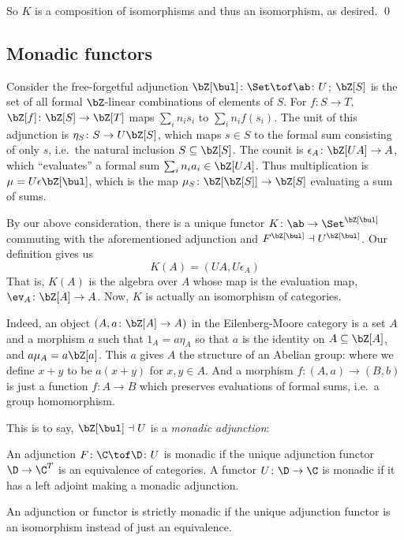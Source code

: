     So $K$ is a composition of isomorphisms and thus an isomorphism, as desired.
    \qed

\eproof

\subsection{Monadic functors}

Consider the free-forgetful adjunction $\bZ[\bul]\colon\Set\tof\ab\colon U$; $\bZ[S]$ is the set of all formal $\bZ$-linear combinations of elements of $S$.
For $f\colon S\to T$, $\bZ[f]\colon\bZ[S]\to\bZ[T]$ maps $\sum_in_is_i$ to $\sum_in_if(s_i)$.
The unit of this adjunction is $\eta_S\colon S\to U\bZ[S]$, which maps $s\in S$ to the formal sum consisting of only $s$, i.e.\ the natural inclusion $S\subseteq\bZ[S]$.
The counit is $\epsilon_A\colon\bZ[UA]\to A$, which ``evaluates'' a formal sum $\sum_in_ia_i\in\bZ[UA]$.
Thus multiplication is $\mu=U\epsilon\bZ[\bul]$, which is the map $\mu_S\colon\bZ[\bZ[S]]\to\bZ[S]$ evaluating a sum of sums.

By our above consideration, there is a unique functor $K\colon\ab\to\Set^{\bZ[\bul]}$ commuting with the aforementioned adjunction and $F^{\bZ[\bul]}\dashv U^{\bZ[\bul]}$.
Our definition gives us
$$ K(A) = (UA,U\epsilon_A) $$
That is, $K(A)$ is the algebra over $A$ whose map is the evaluation map, $\ev_A\colon\bZ[A]\to A$.
Now, $K$ is actually an isomorphism of categories.

Indeed, an object $(A,a\colon\bZ[A]\to A)$ in the Eilenberg-Moore category is a set $A$ and a morphism $a$ such that $1_A=a\eta_A$ so that $a$ is the identity on $A\subseteq\bZ[A]$,
and $a\mu_A=a\bZ[a]$.
This $a$ gives $A$ the structure of an Abelian group: where we define $x+y$ to be $a(x+y)$ for $x,y\in A$.
And a morphism $f\colon(A,a)\to(B,b)$ is just a function $f\colon A\to B$ which preserves evaluations of formal sums, i.e.\ a group homomorphism.

This is to say, $\bZ[\bul]\dashv U$ is a {\it monadic adjunction}:

\bdefn

    An adjunction $F\colon\C\tof\D\colon U$ is {\emphcolor monadic} if the unique adjunction functor $\D\to\C^T$ is an equivalence of categories.
    A functor $U\colon\D\to\C$ is {\emphcolor monadic} if it has a left adjoint making a monadic adjunction.

    An adjunction or functor is {\emphcolor strictly monadic} if the unique adjunction functor is an isomorphism instead of just an equivalence.

